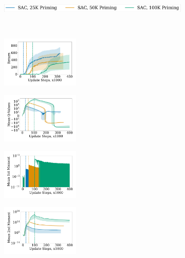 \begin{figure}[t!]
\centering
    \begin{subfigure}[b]{0.8\textwidth}
        \centering
        \includegraphics[height=0.4cm]{figures/dissecting/priming/priming_base_return_legend.pdf}
    \end{subfigure}\\%
    \begin{subfigure}[b]{0.25\textwidth}
        \centering
        \includegraphics[width=3.7cm, trim=1cm 1cm 1cm 1cm ,clip]{figures/dissecting/priming/priming_base_return.pdf}
        \label{subfig:overestimation:overestimation:priming_base_ret}
    \end{subfigure}%
    \begin{subfigure}[b]{0.25\textwidth}
    \centering
        \includegraphics[width=3.7cm, trim=1cm 1cm 1cm 1cm ,clip]{figures/dissecting/priming/priming_base_Q.pdf}
        \label{subfig:overestimation:overestimation:priming_base_Q}
    \end{subfigure}%
    \begin{subfigure}[b]{0.25\textwidth}
        \centering
        \includegraphics[width=3.7cm, trim=1cm 1cm 1cm 1cm ,clip]{figures/dissecting/priming/priming_base_exp_avg.pdf}
        \label{subfig:overestimation:priming_base_mom}
    \end{subfigure}%
    \begin{subfigure}[b]{0.25\textwidth}
        \centering
        \includegraphics[width=3.7cm, trim=1cm 1cm 1cm 1cm ,clip]{figures/dissecting/priming/priming_base_exp_avg_sq.pdf}

\end{subfigure}
\end{figure}
